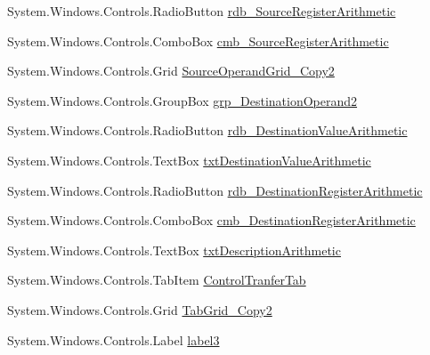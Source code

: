 \begin{DoxyCompactItemize}
System.\+Windows.\+Controls.\+Radio\+Button \hyperlink{class_c_p_u___o_s___simulator_1_1_instructions_window_ad571b65d5fe87bdb079c807dcac0680f}{rdb\+\_\+\+Source\+Register\+Arithmetic}
\item 
System.\+Windows.\+Controls.\+Combo\+Box \hyperlink{class_c_p_u___o_s___simulator_1_1_instructions_window_aad493dd174601ec265d5ad261f33d525}{cmb\+\_\+\+Source\+Register\+Arithmetic}
\item 
System.\+Windows.\+Controls.\+Grid \hyperlink{class_c_p_u___o_s___simulator_1_1_instructions_window_a6a57e0ae92b85cd619ef3d879ef0c628}{Source\+Operand\+Grid\+\_\+\+Copy2}
\item 
System.\+Windows.\+Controls.\+Group\+Box \hyperlink{class_c_p_u___o_s___simulator_1_1_instructions_window_adc32bbf0f47985507d606abb4862072f}{grp\+\_\+\+Destination\+Operand2}
\item 
System.\+Windows.\+Controls.\+Radio\+Button \hyperlink{class_c_p_u___o_s___simulator_1_1_instructions_window_a2e87a90d55ec015190b55bd06c273efc}{rdb\+\_\+\+Destination\+Value\+Arithmetic}
\item 
System.\+Windows.\+Controls.\+Text\+Box \hyperlink{class_c_p_u___o_s___simulator_1_1_instructions_window_adac073cb591b15be22d041695ff498e4}{txt\+Destination\+Value\+Arithmetic}
\item 
System.\+Windows.\+Controls.\+Radio\+Button \hyperlink{class_c_p_u___o_s___simulator_1_1_instructions_window_a40ebdc8941fbd7ae75ca6d14d1153569}{rdb\+\_\+\+Destination\+Register\+Arithmetic}
\item 
System.\+Windows.\+Controls.\+Combo\+Box \hyperlink{class_c_p_u___o_s___simulator_1_1_instructions_window_ad1fafd2bef9ad3f94fab585ea58fc38c}{cmb\+\_\+\+Destination\+Register\+Arithmetic}
\item 
System.\+Windows.\+Controls.\+Text\+Box \hyperlink{class_c_p_u___o_s___simulator_1_1_instructions_window_a31ef64d4c64f9791d6b4aad95cd4d95f}{txt\+Description\+Arithmetic}
\item 
System.\+Windows.\+Controls.\+Tab\+Item \hyperlink{class_c_p_u___o_s___simulator_1_1_instructions_window_a52cb165b57f01928c088b3052de70b5b}{Control\+Tranfer\+Tab}
\item 
System.\+Windows.\+Controls.\+Grid \hyperlink{class_c_p_u___o_s___simulator_1_1_instructions_window_ac4b83982bf62dc5c0484ac2729167ba4}{Tab\+Grid\+\_\+\+Copy2}
\item 
System.\+Windows.\+Controls.\+Label \hyperlink{class_c_p_u___o_s___simulator_1_1_instructions_window_a394b28c312ae1a83128da41990fc5d32}{label3}

\end{DoxyCompactItemize}
